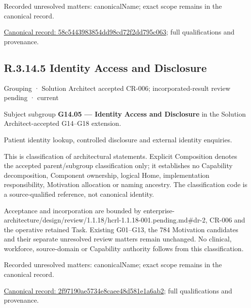 {\small Recorded unresolved matters: canonicalName; exact scope remains in the canonical record.}\par
{\footnotesize \href{../../../../continuum/grouping/58c5443983854dd98cd72f2dd795c063.md}{Canonical record: 58c5443983854dd98cd72f2dd795c063}; full qualifications and provenance.}\par
\subsection*{R.3.14.5 Identity Access and Disclosure}
\label{navigation:R.3.14.5}

\label{element:2f97190ae5734e8caee48d581e1a6ab2}
{\small Grouping · Solution Architect accepted CR-006; incorporated-result review pending · current}\par

Subject subgroup \textbf{G14.05 — Identity Access and Disclosure} in the Solution Architect-accepted G14–G18 extension.



Patient identity lookup, controlled disclosure and external identity enquiries.



This is classification of architectural statements. Explicit Composition denotes the accepted parent/subgroup classification only; it establishes no Capability decomposition, Component ownership, logical Home, implementation responsibility, Motivation allocation or naming ancestry. The classification code is a source-qualified reference, not canonical identity.



Acceptance and incorporation are bounded by enterprise-architecture/design/review/1.1.18/hcrl-1.1.18-001.pending.md\#dr-2, CR-006 and the operative retained Task. Existing G01–G13, the 784 Motivation candidates and their separate unresolved review matters remain unchanged. No clinical, workforce, source-domain or Capability authority follows from this classification.


{\small Recorded unresolved matters: canonicalName; exact scope remains in the canonical record.}\par
{\footnotesize \href{../../../../continuum/grouping/2f97190ae5734e8caee48d581e1a6ab2.md}{Canonical record: 2f97190ae5734e8caee48d581e1a6ab2}; full qualifications and provenance.}\par
